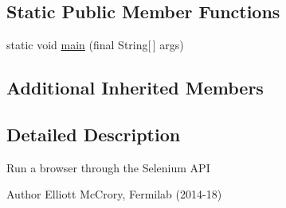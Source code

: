 \subsection*{Static Public Member Functions}
\begin{DoxyCompactItemize}
\item 
static void \hyperlink{classgov_1_1fnal_1_1ppd_1_1dd_1_1display_1_1client_1_1selenium_1_1DisplayAsConnectionThroughSelenium_a4521e424f08cb1e37b0f80fa23d75e54}{main} (final String\mbox{[}$\,$\mbox{]} args)
\end{DoxyCompactItemize}
\subsection*{Additional Inherited Members}


\subsection{Detailed Description}
Run a browser through the Selenium A\-P\-I

\begin{DoxyAuthor}{Author}
Elliott Mc\-Crory, Fermilab (2014-\/18) 
\end{DoxyAuthor}


